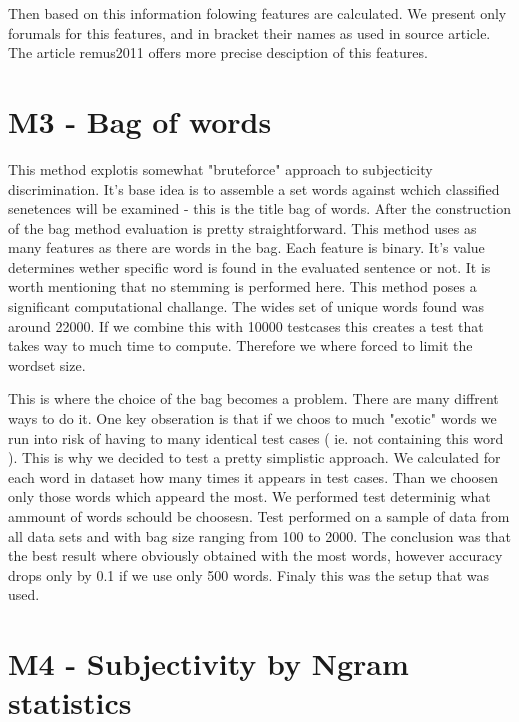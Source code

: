 Then based on this information folowing features are calculated. We present only forumals for this features, and in bracket their names as used in source article. The article {remus2011} offers more precise desciption of this features.


\section{M3 - Bag of words}

This method explotis somewhat "bruteforce" approach to subjecticity discrimination. It's base idea is to assemble a set words against wchich classified senetences will be examined
- this is the title bag of words. After the construction of the bag method evaluation is pretty straightforward. This method uses as many features as there are words in the bag. Each
feature is binary. It's value determines wether specific word is found in the evaluated sentence or not. It is worth mentioning that no stemming is performed here. This method poses a significant computational challange. The wides set of unique
words found was around 22000. If we combine this with 10000 testcases this creates a test that takes way to much time to compute. Therefore we where forced to limit the wordset size. 

This is where the choice of the bag becomes a problem.  There are many diffrent ways to do it. One key obseration is that if we choos to much "exotic" words we run into risk of having to 
many identical test cases ( ie. not containing this word ). This is why we decided to test a pretty simplistic approach. We calculated for each word in dataset how many times it appears in
test cases. Than we choosen  only those words which appeard the most. We performed test determinig what ammount of words schould be choosesn. Test performed on a sample of data from all data
sets and with bag size ranging from 100 to 2000.  The conclusion was that the best result where obviously obtained  with the most words, however accuracy drops only by 0.1 if we use only 500 
words. Finaly this was the setup that was used. 

\section{M4 - Subjectivity by Ngram statistics}

